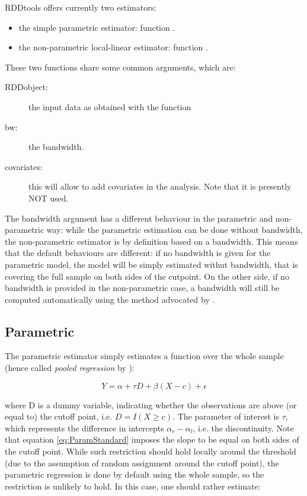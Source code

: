 \documentclass[english,nojss]{jss}\usepackage{graphicx, color}
\begin{document}
RDDtools offers currently two estimators:
\begin{itemize}
\item the simple parametric estimator: function . 
\item the non-parametric local-linear estimator: function . 
\end{itemize}
These two functions share some common arguments, which are:
\begin{description}
\item [{RDDobject:}] the input data as obtained with the 
function
\item [{bw:}] the bandwidth. 
\item [{covariates:}] this will allow to add covariates in the analysis.
Note that it is presently NOT used. 
\end{description}
The bandwidth argument has a different behaviour in the parametric
and non-parametric way: while the parametric estimation can be done
without bandwidth, the non-parametric estimator is by definition based
on a bandwidth. This means that the default behaviours are different:
if no bandwidth is given for the parametric model, the model will
be simply estimated withut bandwidth, that is covering the full sample
on both sides of the cutpoint. On the other side, if no bandwidth
is provided in the non-parametric case, a bandwidth will still be
computed automatically using the method advocated by \citet{ImbensKalyanaraman2012}. 


\subsection{Parametric}

The parametric estimator simply estimates a function over the whole
sample (hence called \emph{pooled regression} by \citealp{LeeLemieux2010}):

\begin{equation}
Y=\alpha+\tau D+\beta(X-c)+\epsilon\label{eq:ParamStandard}
\end{equation}


where D is a dummy variable, indicating whether the observations are
above (or equal to) the cutoff point, i.e. $D=I(X\geq c)$. The parameter
of interest is $\tau$, which represents the difference in intercepts
$\alpha_{r}-\alpha_{l}$, i.e. the discontinuity. Note that equation
\ref{eq:ParamStandard} imposes the slope to be equal on both sides
of the cutoff point. While such restriction should hold locally around
the threshold (due to the assumption of random assignment around the
cutoff point), the parametric regression is done by default using
the whole sample, so the restriction is unlikely to hold. In this
case, one should rather estimate:
\end{document}
